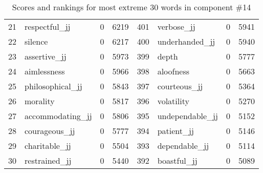 \begin{table}[tbp]
\begin{tabular}{| rlr@{.}l | rlr@{.}l |}
    21 & respectful\_jj & 0 & 6219    &    401 & verbose\_jj & 0 & 5941 \\
    22 & silence & 0 & 6217    &    400 & underhanded\_jj & 0 & 5940 \\
    23 & assertive\_jj & 0 & 5973    &    399 & depth & 0 & 5777 \\
    24 & aimlessness & 0 & 5966    &    398 & aloofness & 0 & 5663 \\
    25 & philosophical\_jj & 0 & 5843    &    397 & courteous\_jj & 0 & 5364 \\
    26 & morality & 0 & 5817    &    396 & volatility & 0 & 5270 \\
    27 & accommodating\_jj & 0 & 5806    &    395 & undependable\_jj & 0 & 5152 \\
    28 & courageous\_jj & 0 & 5777    &    394 & patient\_jj & 0 & 5146 \\
    29 & charitable\_jj & 0 & 5504    &    393 & dependable\_jj & 0 & 5114 \\
    30 & restrained\_jj & 0 & 5440    &    392 & boastful\_jj & 0 & 5089 \\
    \hline
    \end{tabular}
    \caption{Scores and rankings for most extreme 30 words in component \#14} 
\end{table}
\clearpage
